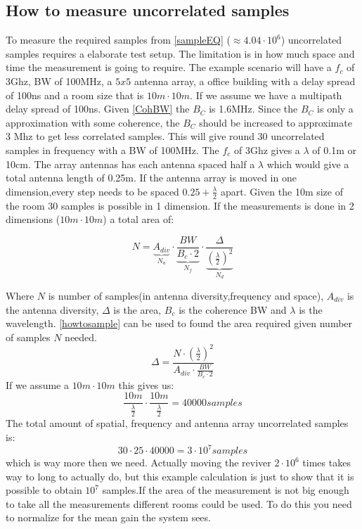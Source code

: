 \subsection{How to measure uncorrelated samples}
\label{howtomeasureUS}
To measure the required samples from \autoref{sampleEQ} ($\approx 4.04\cdot10^6$) uncorrelated samples requires a elaborate test setup. The limitation is in how much space and time the measurement is going to require. The example scenario  will have a $f_c$ of 3Ghz, BW of 100MHz, a $5x5$ antenna array, a office building with a delay spread of 100ns and a room size that is $10m \cdot 10m$.
If we assume we have a multipath delay spread of 100ns. Given \autoref{CohBW} the $B_C$ is 1.6MHz. Since the $B_C$ is only a approximation with some coherence, the $B_C$ should be increased to approximate 3 Mhz to get less correlated samples. This will give round 30 uncorrelated samples in frequency with a BW of 100MHz.
The $f_c$ of 3Ghz gives a $\lambda$ of 0.1m or 10cm. The array antennas has each antenna spaced half a $\lambda$ which would give a total antenna length of 0.25m. If the antenna array is moved in one dimension,every step needs to be spaced $0.25+\frac{\lambda}{2}$ apart. Given the 10m size of the room 30 samples is possible in 1 dimension. If the measurements is done in 2 dimensions ($10m\cdot 10m$) a total area of:

\begin{equation}
N = \underbrace{A_{div}}_\text{$N_a$} \cdot \underbrace{\frac{BW}{B_c \cdot 2}}_\text{$N_f$} \cdot \underbrace{\frac{\Delta}{(\frac{\lambda}{2})^2}}_\text{$N_d$}
\label{howtosample}
\end{equation} 
 
Where $N$ is number of samples(in antenna diversity,frequency and space), $A_{div}$ is the antenna diversity, $\Delta$ is the area, $B_c$ is the coherence BW and $\lambda$ is the wavelength.
\autoref{howtosample} can be used to found the area required given number of samples $N$ needed.
\begin{equation}
\Delta  = \frac{N\cdot (\frac{\lambda}{2})^2}{A_{div}\cdot \frac{BW}{B_c \cdot 2}}
\label{howtosqaure}
\end{equation}
If we assume a $10m \cdot 10m$ this gives us: 
\begin{equation}
\frac{10m}{\frac{\lambda}{2}} \cdot \frac{10m}{\frac{\lambda}{2}}  = 40000 samples
\end{equation}
The total amount of spatial, frequency and antenna array uncorrelated samples is:
\begin{equation}
30 \cdot 25 \cdot 40000 = 3 \cdot 10^7 samples
\end{equation}
which is way more then we need.
Actually moving the reviver $2 \cdot 10^6$ times takes way to long to actually do, but this example calculation is just to show that it is possible to obtain $10^7$ samples.If the area of the measurement is not big enough to take all the measurements different rooms could be used. To do this you need to normalize for the mean gain the system sees. 

